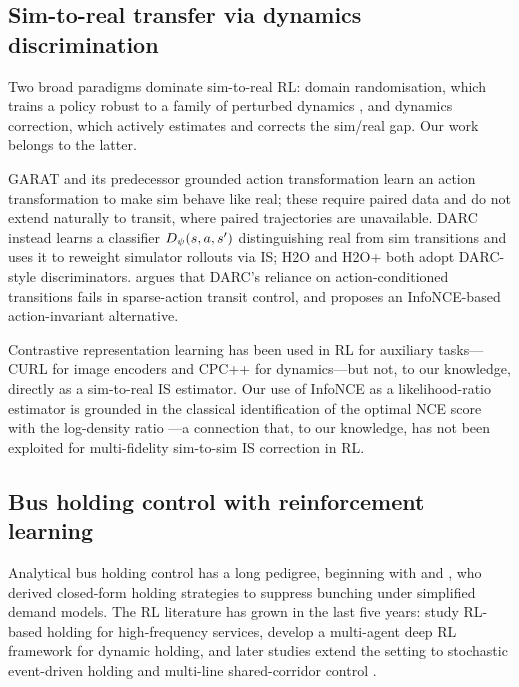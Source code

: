\subsection{Sim-to-real transfer via dynamics discrimination}

Two broad paradigms dominate sim-to-real RL: domain randomisation, which trains a policy robust to a family of perturbed dynamics \citep{tobin2017domain, peng2018sim}, and dynamics correction, which actively estimates and corrects the sim/real gap.
Our work belongs to the latter.

GARAT \citep{desai2020garat} and its predecessor grounded action transformation \citep{hanna2017grounded} learn an action transformation to make sim behave like real; these require paired data and do not extend naturally to transit, where paired trajectories are unavailable.
DARC \citep{eysenbach2021off} instead learns a classifier $D_\psi(s,a,s')$ distinguishing real from sim transitions and uses it to reweight simulator rollouts via IS; H2O and H2O+ both adopt DARC-style discriminators.
 argues that DARC's reliance on action-conditioned transitions fails in sparse-action transit control, and proposes an InfoNCE-based action-invariant alternative.

Contrastive representation learning has been used in RL for auxiliary tasks---CURL \citep{laskin2020curl} for image encoders and CPC++ \citep{mazoure2020deep} for dynamics---but not, to our knowledge, directly as a sim-to-real IS estimator.
Our use of InfoNCE as a likelihood-ratio estimator is grounded in the classical identification of the optimal NCE score with the log-density ratio \citep{oord2018representation, ma2018nce, poole2019variational}---a connection that, to our knowledge, has not been exploited for multi-fidelity sim-to-sim IS correction in RL.

\subsection{Bus holding control with reinforcement learning}

Analytical bus holding control has a long pedigree, beginning with \citet{daganzo2009headway} and \citet{xuan2011dynamic}, who derived closed-form holding strategies to suppress bunching under simplified demand models.
The RL literature has grown in the last five years: \citet{alesiani2018reinforcement} study RL-based holding for high-frequency services, \citet{wang2020real} develop a multi-agent deep RL framework for dynamic holding, and later studies extend the setting to stochastic event-driven holding and multi-line shared-corridor control \citep{liu2023deepholding, wang2023multiobjective}.

